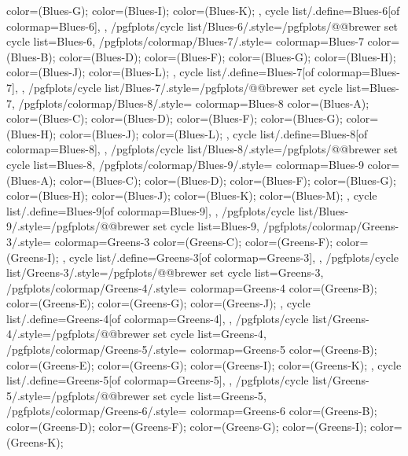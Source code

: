{{{      color=(Blues-G);
      color=(Blues-I);
      color=(Blues-K);
    },
    cycle list/.define={Blues-6}{[of colormap=Blues-6]},
  },
  /pgfplots/cycle list/Blues-6/.style={/pgfplots/@@brewer set cycle list={Blues-6}},
  /pgfplots/colormap/Blues-7/.style={
    colormap={Blues-7}{
      color=(Blues-B);
      color=(Blues-D);
      color=(Blues-F);
      color=(Blues-G);
      color=(Blues-H);
      color=(Blues-J);
      color=(Blues-L);
    },
    cycle list/.define={Blues-7}{[of colormap=Blues-7]},
  },
  /pgfplots/cycle list/Blues-7/.style={/pgfplots/@@brewer set cycle list={Blues-7}},
  /pgfplots/colormap/Blues-8/.style={
    colormap={Blues-8}{
      color=(Blues-A);
      color=(Blues-C);
      color=(Blues-D);
      color=(Blues-F);
      color=(Blues-G);
      color=(Blues-H);
      color=(Blues-J);
      color=(Blues-L);
    },
    cycle list/.define={Blues-8}{[of colormap=Blues-8]},
  },
  /pgfplots/cycle list/Blues-8/.style={/pgfplots/@@brewer set cycle list={Blues-8}},
  /pgfplots/colormap/Blues-9/.style={
    colormap={Blues-9}{
      color=(Blues-A);
      color=(Blues-C);
      color=(Blues-D);
      color=(Blues-F);
      color=(Blues-G);
      color=(Blues-H);
      color=(Blues-J);
      color=(Blues-K);
      color=(Blues-M);
    },
    cycle list/.define={Blues-9}{[of colormap=Blues-9]},
  },
  /pgfplots/cycle list/Blues-9/.style={/pgfplots/@@brewer set cycle list={Blues-9}},
  /pgfplots/colormap/Greens-3/.style={
    colormap={Greens-3}{
      color=(Greens-C);
      color=(Greens-F);
      color=(Greens-I);
    },
    cycle list/.define={Greens-3}{[of colormap=Greens-3]},
  },
  /pgfplots/cycle list/Greens-3/.style={/pgfplots/@@brewer set cycle list={Greens-3}},
  /pgfplots/colormap/Greens-4/.style={
    colormap={Greens-4}{
      color=(Greens-B);
      color=(Greens-E);
      color=(Greens-G);
      color=(Greens-J);
    },
    cycle list/.define={Greens-4}{[of colormap=Greens-4]},
  },
  /pgfplots/cycle list/Greens-4/.style={/pgfplots/@@brewer set cycle list={Greens-4}},
  /pgfplots/colormap/Greens-5/.style={
    colormap={Greens-5}{
      color=(Greens-B);
      color=(Greens-E);
      color=(Greens-G);
      color=(Greens-I);
      color=(Greens-K);
    },
    cycle list/.define={Greens-5}{[of colormap=Greens-5]},
  },
  /pgfplots/cycle list/Greens-5/.style={/pgfplots/@@brewer set cycle list={Greens-5}},
  /pgfplots/colormap/Greens-6/.style={
    colormap={Greens-6}{
      color=(Greens-B);
      color=(Greens-D);
      color=(Greens-F);
      color=(Greens-G);
      color=(Greens-I);
      color=(Greens-K);
}}}
